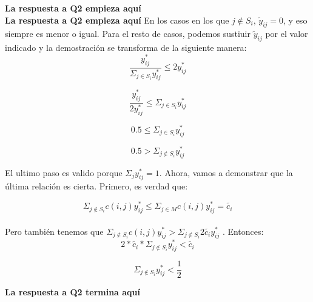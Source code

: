 \textbf{La respuesta a Q2 empieza aquí} 
\\
\textbf{La respuesta a Q2 empieza aquí}
En los casos en los que $j \notin S_i$, $\tilde{y}_{ij} = 0$, y eso siempre es menor o igual.
Para el resto de casos, podemos sustiuir $\tilde{y}_{ij}$ por el valor indicado y la demostración se transforma de la siguiente manera:
\begin{equation}
 \frac{y^*_{ij}}{\Sigma_{j \in S_i} y^*_{ij}} \leq 2y^*_{ij}
\end{equation}

\begin{equation}
 \frac{y^*_{ij}}{2y^*_{ij}} \leq \Sigma_{j \in S_i} y^*_{ij}
\end{equation}

\begin{equation}
 0.5 \leq \Sigma_{j \in S_i} y^*_{ij}
\end{equation}

\begin{equation}
 0.5 > \Sigma_{j \notin S_i} y^*_{ij}
\end{equation}

El ultimo paso es valido porque $\Sigma_{j} y^*_{ij} = 1$. Ahora, vamos a demonstrar que la última relación es cierta. Primero, es verdad que:

\begin{equation}
 \Sigma_{j \notin S_i} c(i,j) y^*_{ij} \leq \Sigma_{j \in M} c(i,j) y^*_{ij} = \tilde{c_i}
\end{equation}
\\
Pero también tenemos que $\Sigma_{j \notin S_i} c(i,j) y^*_{ij} > \Sigma_{j \notin S_i} 2 \tilde{c_i} y^*_{ij}$ . Entonces:
\\
\begin{equation}
 2* \tilde{c_i} * \Sigma_{j \notin S_i} y^*_{ij}  < \tilde{c_i}
\end{equation}

\begin{equation}
 \Sigma_{j \notin S_i} y^*_{ij} < \frac{1}{2}
\end{equation}

\textbf{La respuesta a Q2 termina aquí}

